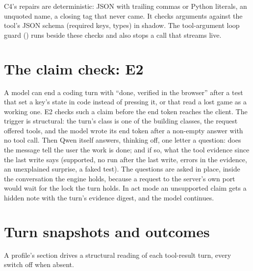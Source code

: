 C4's repairs are deterministic: JSON with trailing commas or Python literals, an unquoted name, a closing tag that never came. It checks arguments against the tool's JSON schema (required keys, types) in shadow. The tool-argument loop guard () runs beside these checks and also stops a call that streams live.

\section{The claim check: E2}

A model can end a coding turn with \enquote{done, verified in the browser} after a test that set a key's state in code instead of pressing it, or that read a lost game as a working one. E2 checks such a claim before the end token reaches the client. The trigger is structural: the turn's class is one of the building classes, the request offered tools, and the model wrote its end token after a non-empty answer with no tool call. Then Qwen itself answers, thinking off, one letter a question: does the message tell the user the work is done; and if so, what the tool evidence since the last write says (supported, no run after the last write, errors in the evidence, an unexplained surprise, a faked test). The questions are asked in place, inside the conversation the engine holds, because a request to the server's own port would wait for the lock the turn holds. In act mode an unsupported claim gets a hidden note with the turn's evidence digest, and the model continues.

\section{Turn snapshots and outcomes}

A profile's  section drives a structural reading of each tool-result turn, every switch off when absent.

